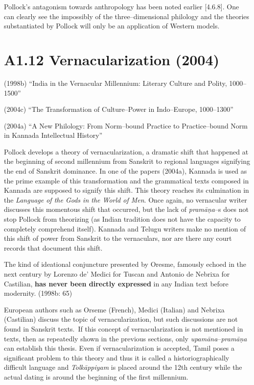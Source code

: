 Pollock’s antagonism towards anthropology has been noted earlier [4.6.8]. One can clearly see the impossibly of the three–dimensional philology and the theories substantiated by Pollock will only be an application of Western models.

\vspace {-.4cm}

\section*{A1.12 Vernacularization (2004)}

(1998b) “India in the Vernacular Millennium: Literary Culture and Polity, 1000–1500”

(2004c) “The Transformation of Culture–Power in Indo–Europe, 1000–1300”

(2004a) “A New Philology: From Norm–bound Practice to Practice–bound Norm in Kannada Intellectual History”

Pollock develops a theory of vernacularization, a dramatic shift that happened at the beginning of second millennium from Sanskrit to regional languages signifying the end of Sanskrit dominance. In one of the papers (2004a), Kannada is used as the prime example of this transformation and the grammatical texts composed in Kannada are supposed to signify this shift. This theory reaches its culmination in the \textit{Language of the Gods in the World of Men}. Once again, no vernacular writer discusses this momentous shift that occurred, but the lack of \textit{pramāṇa}–s does not stop Pollock from theorizing (as Indian tradition does not have the capacity to completely comprehend itself). Kannada and Telugu writers make no mention of this shift of power from Sanskrit to the vernaculars, nor are there any court records that document this shift.

\begin{myquote}
The kind of ideational conjuncture presented by Oresme, famously echoed in the next century by Lorenzo de’ Medici for Tuscan and Antonio de Nebrixa for Castilian, \textbf{has never been directly expressed} in any Indian text before modernity. (1998b: 65)
\end{myquote}

European authors such as Orseme (French), Medici (Italian) and Nebrixa (Castilian) discuss the topic of vernacularization, but such discussions are not found in Sanskrit texts.~If this concept of vernacularization is not mentioned in texts, then as repeatedly shown in the previous sections, only \textit{upamāna}–\textit{pramāṇa} can establish this thesis. Even if vernacularization is accepted, Tamil poses a significant problem to this theory and thus it is called a historiographically difficult language and \textit{Tolkāppiyam} is placed around the 12th century while the actual dating is around the beginning of the first millennium.

